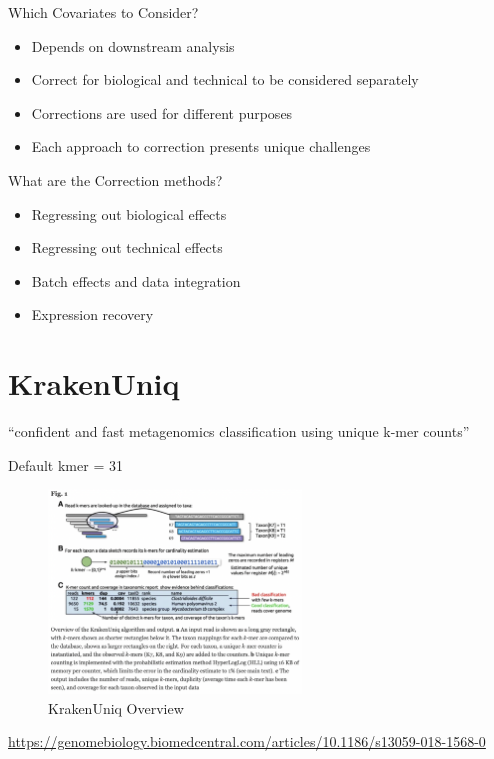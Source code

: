 \documentclass[
]{book}
\providecommand{\tightlist}{%
  \setlength{\itemsep}{0pt}\setlength{\parskip}{0pt}}
\begin{document}
Which Covariates to Consider?

\begin{itemize}
\tightlist
\item
  Depends on downstream analysis
\item
  Correct for biological and technical to be considered separately
\item
  Corrections are used for different purposes
\item
  Each approach to correction presents unique challenges
\end{itemize}

What are the Correction methods?

\begin{itemize}
\tightlist
\item
  Regressing out biological effects
\item
  Regressing out technical effects
\item
  Batch effects and data integration
\item
  Expression recovery
\end{itemize}

\hypertarget{krakenuniq}{%
\chapter{KrakenUniq}\label{krakenuniq}}

``confident and fast metagenomics classification using unique k-mer counts''

Default kmer = 31

\begin{figure}
\centering
\includegraphics[width=0.6\textwidth,height=\textheight]{./Figures/KrakenUniq.png}
\caption{KrakenUniq Overview}
\end{figure}

\url{https://genomebiology.biomedcentral.com/articles/10.1186/s13059-018-1568-0}
\end{document}
